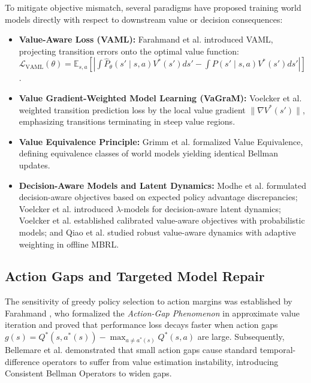 \documentclass[journal,10pt,twocolumn]{IEEEtran}
\begin{document}
To mitigate objective mismatch, several paradigms have proposed training world models directly with respect to downstream value or decision consequences:
\begin{itemize}
    \item \textbf{Value-Aware Loss (VAML):} Farahmand et al. \cite{farahmand2017value} introduced VAML, projecting transition errors onto the optimal value function: $\mathcal{L}_{\mathrm{VAML}}(\theta) = \mathbb{E}_{s, a}[ |\int \hat{P}_\theta(s' \mid s, a) V^*(s') ds' - \int P(s' \mid s, a) V^*(s') ds'| ]$.
    \item \textbf{Value Gradient-Weighted Model Learning (VaGraM):} Voelcker et al. \cite{voelcker2022value} weighted transition prediction loss by the local value gradient $\|\nabla V^*(s')\|$, emphasizing transitions terminating in steep value regions.
    \item \textbf{Value Equivalence Principle:} Grimm et al. \cite{grimm2020value, grimm2021proper} formalized Value Equivalence, defining equivalence classes of world models yielding identical Bellman updates.
    \item \textbf{Decision-Aware Models and Latent Dynamics:} Modhe et al. \cite{modhe2021model} formulated decision-aware objectives based on expected policy advantage discrepancies; Voelcker et al. \cite{voelcker2023lambda} introduced $\lambda$-models for decision-aware latent dynamics; Voelcker et al. \cite{voelcker2025calibrated} established calibrated value-aware objectives with probabilistic models; and Qiao et al. \cite{qiao2026model} studied robust value-aware dynamics with adaptive weighting in offline MBRL.
\end{itemize}

\subsection{Action Gaps and Targeted Model Repair}
\label{subsec:action_gaps_boundaries}

The sensitivity of greedy policy selection to action margins was established by Farahmand \cite{farahmand2011action}, who formalized the \emph{Action-Gap Phenomenon} in approximate value iteration and proved that performance loss decays faster when action gaps $g(s) = Q^*(s, a^*(s)) - \max_{a \neq a^*(s)} Q^*(s, a)$ are large. 
Subsequently, Bellemare et al. \cite{bellemare2016increasing} demonstrated that small action gaps cause standard temporal-difference operators to suffer from value estimation instability, introducing Consistent Bellman Operators to widen gaps.
\end{document}

